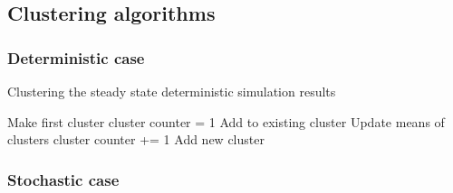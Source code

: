 \subsection{Clustering algorithms}

\subsubsection{Deterministic case}
\begin{algorithm}
\label{alg:DetClustering}
  \caption{Clustering the steady state deterministic simulation results}
 \begin{algorithmic}[1]
    \Statex
      		\State Make first cluster
      		\State cluster counter = 1
      	\Else
      					\State Add to existing cluster
      					\State Update means of clusters
      			\EndIf
      				\State cluster counter +=  1
      				\State Add new cluster
      			\EndIf
      		\EndFor
      	\EndIf
      \EndFor
  \end{algorithmic}
\end{algorithm}
\subsubsection{Stochastic case}
